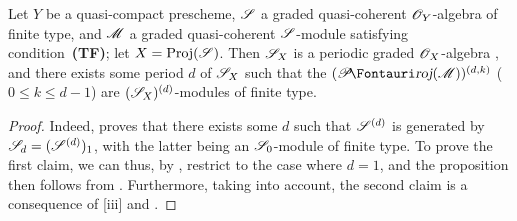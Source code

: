 \begin{proposition}[8.14.14]
\label{II.8.14.14}
Let $Y$ be a quasi-compact prescheme, $\mathscr{S}$ a graded quasi-coherent $\mathscr{O}_Y$-algebra of finite type, and $\mathscr{M}$ a graded quasi-coherent $\mathscr{S}$-module satisfying condition~\textbf{(TF)};
let $X=\operatorname{Proj}(\mathscr{S})$.
Then $\mathscr{S}_X$ is a periodic graded $\mathscr{O}_X$-algebra , and there exists
some period $d$ of $\mathscr{S}_X$ such that the $(\shProj(\sh{M}))^{(d,k)}$ ($0\leq k\leq d-1$) are $(\mathscr{S}_X)^{(d)}$-modules of finite type.
\end{proposition}

\begin{proof}
\label{proof-II.8.14.14}
Indeed,  proves that there exists some $d$ such that $\mathscr{S}^{(d)}$ is generated by $\mathscr{S}_d=(\mathscr{S}^{(d)})_1$, with the latter being an $\mathscr{S}_0$-module of finite type.
To prove the first claim, we can thus, by , restrict to the case where $d=1$, and the proposition then follows from .
Furthermore, taking  into account, the second claim is a consequence of [iii] and .
\end{proof}
